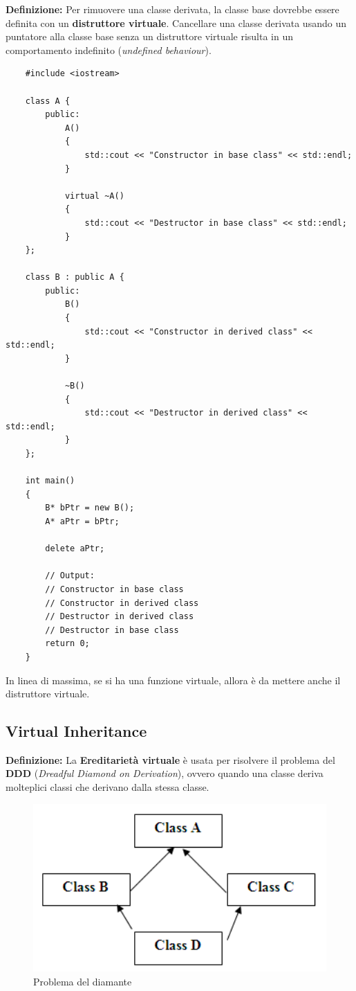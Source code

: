 \textsf{\small \textbf{Definizione:} Per rimuovere una classe derivata, la classe base dovrebbe essere definita con un \textbf{distruttore virtuale}. Cancellare una classe derivata usando un puntatore alla classe base senza un distruttore virtuale risulta in un comportamento indefinito (\emph{undefined behaviour}).} \\

\begin{lstlisting}
	#include <iostream>
	
	class A {
		public:
			A()
			{
				std::cout << "Constructor in base class" << std::endl;
			}	
		
			virtual ~A()
			{
				std::cout << "Destructor in base class" << std::endl;
			}
	};

	class B : public A {
		public:
			B()
			{
				std::cout << "Constructor in derived class" << std::endl;
			}
		
			~B()
			{
				std::cout << "Destructor in derived class" << std::endl;
			}
	};

	int main()
	{
		B* bPtr = new B();
		A* aPtr = bPtr;
		
		delete aPtr;
		
		// Output: 
		// Constructor in base class
		// Constructor in derived class
		// Destructor in derived class
		// Destructor in base class
		return 0;
	}
\end{lstlisting}

\textsf{\small In linea di massima, se si ha una funzione virtuale, allora è da mettere anche il distruttore virtuale.} \break

\subsection{Virtual Inheritance}

\textsf{\small \textbf{Definizione:} La \textbf{Ereditarietà virtuale} è usata per risolvere il problema del \textbf{DDD} (\emph{Dreadful Diamond on Derivation}), ovvero quando una classe deriva molteplici classi che derivano dalla stessa classe.} \\

\begin{figure}[H]
	\centering
	\includegraphics[width=1\textwidth, height=1\textheight, keepaspectratio]{./imgs/diamond_problem2.png}
	\caption{Problema del diamante}
	\label{fig:diamond_problem}
\end{figure}

